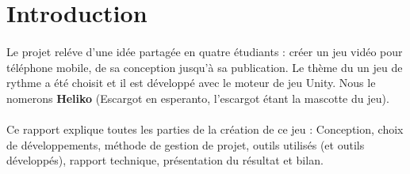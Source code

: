 \section{Introduction}

\paragraph{}
Le projet reléve d'une idée partagée en quatre étudiants : créer un jeu vidéo pour téléphone mobile, de sa conception jusqu'à sa publication. Le thème du un jeu de rythme a été choisit et il est développé avec le moteur de jeu Unity. Nous le nomerons \textbf{Heliko} (Escargot en esperanto, l'escargot étant la mascotte du jeu).

\paragraph{}
Ce rapport explique toutes les parties de la création de ce jeu : Conception, choix de développements, méthode de gestion de projet, outils utilisés (et outils développés), rapport technique, présentation du résultat et bilan.